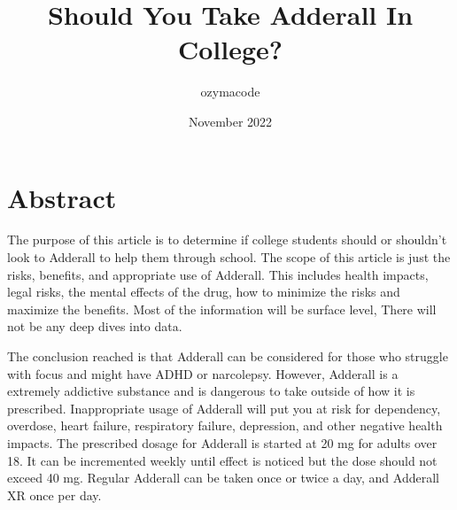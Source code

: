 \documentclass{article}
\title{Should You Take Adderall In College?}
\author{ozymacode}
\date{November 2022}
\begin{document}
    \maketitle
    \pagebreak
    \tableofcontents
    \pagebreak
    
    \section{Abstract}
        The purpose of this article is to determine if college students should or shouldn't look to Adderall to help them through school. The scope of this article is just the risks, benefits, and appropriate use of Adderall. This includes health impacts, legal risks, the mental effects of the drug, how to minimize the risks and maximize the benefits. Most of the information will be surface level, There will not be any deep dives into data. 
        
        The conclusion reached is that Adderall can be considered for those who struggle with focus and might have ADHD or narcolepsy. However, Adderall is a extremely addictive substance and is dangerous to take outside of how it is prescribed. Inappropriate usage of Adderall will put you at risk for dependency, overdose, heart failure, respiratory failure, depression, and other negative health impacts. The prescribed dosage for Adderall is started at 20 mg for adults over 18. It can be incremented weekly until effect is noticed but the dose should not exceed 40 mg. Regular Adderall can be taken once or twice a day, and Adderall XR once per day.
    
\end{document}
